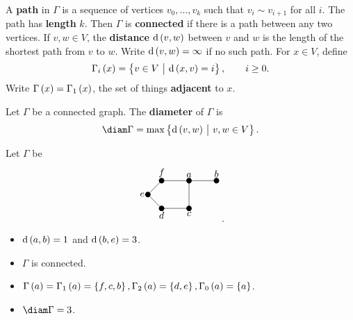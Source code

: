 \begin{definition*}
A \textbf{path} in $ \Gamma $ is a sequence of vertices $ v_0, \dots, v_k $ such that $ v_i \sim v_{i + 1} $ for all $ i $. The path has \textbf{length} $ k $. Then $ \Gamma $ is \textbf{connected} if there is a path between any two vertices. If $ v, w \in V $, the \textbf{distance} $ \d\br{v, w} $ between $ v $ and $ w $ is the length of the shortest path from $ v $ to $ w $. Write $ \d\br{v, w} = \infty $ if no such path. For $ x \in V $, define
$$ \Gamma_i\br{x} = \cbr{v \in V \st \d\br{x, v} = i}, \qquad i \ge 0. $$
Write $ \Gamma\br{x} = \Gamma_1\br{x} $, the set of things \textbf{adjacent} to $ x $.
\end{definition*}

\begin{definition*}
Let $ \Gamma $ be a connected graph. The \textbf{diameter} of $ \Gamma $ is
$$ \diam \Gamma = \max\cbr{\d\br{v, w} \st v, w \in V}. $$
\end{definition*}

\begin{example*}
Let $ \Gamma $ be
$$
\begin{tikzpicture}
\fill (0, 0) circle (0.1) node[above]{$ f $};
\fill (1, 0) circle (0.1) node[above]{$ a $};
\fill (2, 0) circle (0.1) node[above]{$ b $};
\fill (-0.5, -0.5) circle (0.1) node[left]{$ e $};
\fill (0, -1) circle (0.1) node[below]{$ d $};
\fill (1, -1) circle (0.1) node[below]{$ c $};
\draw (0, 0) to (1, 0);
\draw (1, 0) to (2, 0);
\draw (0, 0) to (-0.5, -0.5);
\draw (1, 0) to (1, -1);
\draw (-0.5, -0.5) to (0, -1);
\draw (0, -1) to (1, -1);
\end{tikzpicture}.
$$
\begin{itemize}
\item $ \d\br{a, b} = 1 $ and $ \d\br{b, e} = 3 $.
\item $ \Gamma $ is connected.
\item $ \Gamma\br{a} = \Gamma_1\br{a} = \cbr{f, c, b}, \Gamma_2\br{a} = \cbr{d, e}, \Gamma_0\br{a} = \cbr{a} $.
\item $ \diam \Gamma = 3 $.
\end{itemize}
\end{example*}

